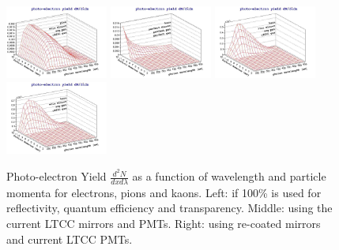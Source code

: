 \documentclass{article}
\begin{document}
\begin{figure}[h]
	\includegraphics[width=0.3\textwidth]{img/photon_yield_spectrum_pion_gasc4f10_mirrorecis_pmtuvg.jpg}
	\includegraphics[width=0.3\textwidth]{img/photon_yield_spectrum_kaon_gasperfect_mirrorperfect_pmtperfect.jpg}
	\includegraphics[width=0.3\textwidth]{img/photon_yield_spectrum_kaon_gasc4f10_mirrorltcc_pmtuvg.jpg}
	\includegraphics[width=0.3\textwidth]{img/photon_yield_spectrum_kaon_gasc4f10_mirrorecis_pmtuvg.jpg}
	\caption{\scriptsize Photo-electron Yield $\frac{d^2N}{dxd\lambda}$  as a function of wavelength and particle momenta 
	for electrons, pions and kaons. Left: if 100\% is used for reflectivity, quantum efficiency and transparency. Middle: using the current LTCC 
	mirrors and PMTs. Right: using re-coated mirrors and current LTCC PMTs.}
	\label{fig:spectra}
\end{figure}
\end{document}
